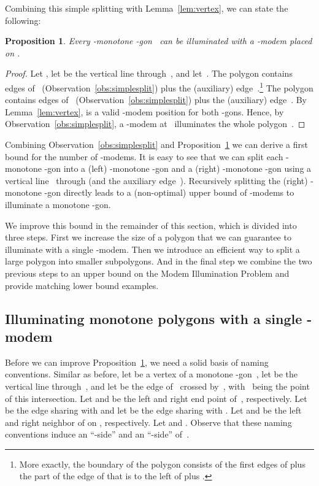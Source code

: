 \documentclass[A4]{article}
\newtheorem{proposition}[theorem]{Proposition}
\begin{document}
Combining this simple splitting with Lemma~\ref{lem:vertex}, we can state the following:


\begin{proposition}\label{prop:2k+3}
Every -monotone -gon~ can be illuminated with a \mbox{-modem} placed on .
\end{proposition}
\begin{proof}
  Let , let  be the vertical line through~, and let~.
The polygon  contains  edges of~ (Observation~\ref{obs:simplesplit}) plus the (auxiliary) edge~.\footnote{More exactly, the boundary of the polygon  consists of the first  edges of  plus the part of the  edge of  that is to the left of  plus .}
  The polygon  contains  edges of~ (Observation~\ref{obs:simplesplit}) plus the (auxiliary) edge~.
By Lemma~\ref{lem:vertex},  is a valid \mbox{-modem} position for both -gons.
Hence, by Observation~\ref{obs:simplesplit}, a \mbox{-modem} at~ illuminates the whole polygon~. 
\end{proof}

Combining Observation~\ref{obs:simplesplit} and Proposition~\ref{prop:2k+3} we can derive a first bound for the number of \mbox{-modems}.
It is easy to see that we can split each -monotone -gon into a (left) -monotone -gon and a (right) -monotone -gon using a vertical line~ through  (and the auxiliary edge~).
Recursively splitting the (right) -monotone -gon directly leads to a (non-optimal) upper bound of  \mbox{-modems} to illuminate a monotone -gon.

We improve this bound in the remainder of this section, which is divided into three steps.
First we increase the size of a polygon that we can guarantee to illuminate with a single \mbox{-modem}.
Then we introduce an efficient way to split a large polygon into smaller subpolygons.
And in the final step we combine the two previous steps to an upper bound on the Modem Illumination Problem and provide matching lower bound examples.



\subsection{Illuminating monotone polygons with a single -modem}
\label{sec:gmono-single}


Before we can improve Proposition~\ref{prop:2k+3}, we need a solid basis of naming conventions.
Similar as before, let  be a vertex of a monotone -gon~, let  be the vertical line through~, and let  be the edge of~ crossed by~, with~ being the point of this intersection.
Let  and  be the left and right end point of~, respectively.
Let  be the edge sharing  with  and let  be the edge sharing  with .
Let  and  be the left and right neighbor of  on , respectively.
Let  and .
Observe that these naming conventions induce an ``-side'' and an ``-side'' of~.
\end{document}
